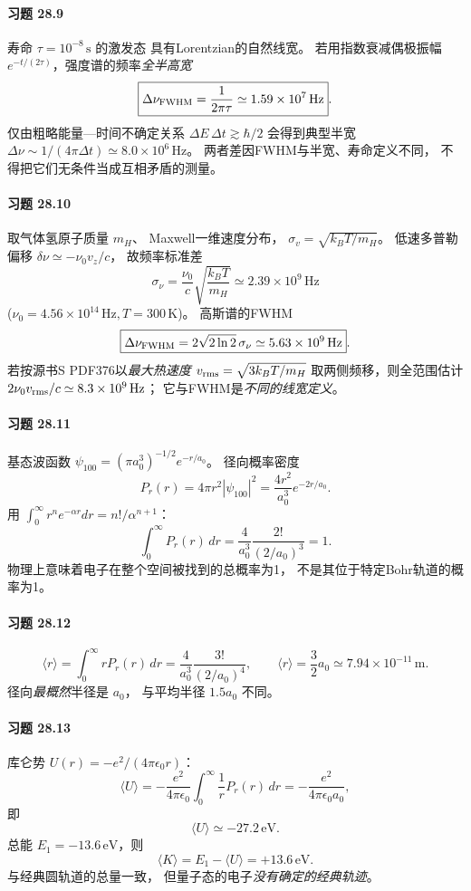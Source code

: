 \paragraph{习题 28.9}
寿命 \(\tau=10^{-8}\,\mathrm s\) 的激发态
具有Lorentzian的自然线宽。
若用指数衰减偶极振幅
\(e^{-t/(2\tau)}\)，强度谱的频率\emph{全半高宽}
\[
\boxed{\Delta\nu_{\rm FWHM}=\frac1{2\pi\tau}
\simeq1.59\times10^7\,\mathrm{Hz}}.
\]
仅由粗略能量—时间不确定关系
\(\Delta E\,\Delta t\gtrsim\hbar/2\)
会得到典型半宽
\(\Delta\nu\sim1/(4\pi\Delta t)\simeq8.0\times10^6\,\mathrm{Hz}\)。
两者差因FWHM与半宽、寿命定义不同，
不得把它们无条件当成互相矛盾的测量。

\paragraph{习题 28.10}
取气体氢原子质量 \(m_H\)、
Maxwell一维速度分布，
\(\sigma_v=\sqrt{k_BT/m_H}\)。
低速多普勒偏移
\(\delta\nu\simeq-\nu_0v_z/c\)，
故频率标准差
\[
\boxed{\sigma_\nu
=\frac{\nu_0}{c}\sqrt{\frac{k_BT}{m_H}}
\simeq2.39\times10^9\,\mathrm{Hz}}
\]
(\(\nu_0=4.56\times10^{14}\,\mathrm{Hz},T=300\,\mathrm K\))。
高斯谱的FWHM
\[
\boxed{\Delta\nu_{\rm FWHM}
=2\sqrt{2\ln2}\,\sigma_\nu
\simeq5.63\times10^9\,\mathrm{Hz}}.
\]
若按源书S PDF376以\emph{最大热速度}
\(v_{\rm rms}=\sqrt{3k_BT/m_H}\)
取两侧频移，则全范围估计
\(2\nu_0v_{\rm rms}/c\simeq8.3\times10^9\,\mathrm{Hz}\)；
它与FWHM是\emph{不同的线宽定义}。

\paragraph{习题 28.11}
基态波函数
\(\psi_{100}=(\pi a_0^3)^{-1/2}e^{-r/a_0}\)。
径向概率密度
\[
P_r(r)=4\pi r^2|\psi_{100}|^2
=\frac{4r^2}{a_0^3}e^{-2r/a_0}.
\]
用 \(\int_0^\infty r^ne^{-\alpha r}dr=n!/\alpha^{n+1}\)：
\[
\boxed{\int_0^\infty P_r(r)\,dr
=\frac4{a_0^3}\frac{2!}{(2/a_0)^3}=1}.
\]
物理上意味着电子在整个空间被找到的总概率为1，
不是其位于特定Bohr轨道的概率为1。

\paragraph{习题 28.12}
\[
\langle r\rangle=\int_0^\infty rP_r(r)\,dr
=\frac4{a_0^3}\frac{3!}{(2/a_0)^4},
\qquad
\boxed{\langle r\rangle=\frac32a_0
\simeq7.94\times10^{-11}\,\mathrm m}.
\]
径向\emph{最概然}半径是 \(a_0\)，
与平均半径 \(1.5a_0\) 不同。

\paragraph{习题 28.13}
库仑势 \(U(r)=-e^2/(4\pi\epsilon_0r)\)：
\[
\langle U\rangle=-\frac{e^2}{4\pi\epsilon_0}
\int_0^\infty \frac1rP_r(r)\,dr
=-\frac{e^2}{4\pi\epsilon_0a_0},
\]
即
\[
\boxed{\langle U\rangle\simeq-27.2\,\mathrm{eV}}.
\]
总能 \(E_1=-13.6\,\mathrm{eV}\)，则
\[
\boxed{\langle K\rangle=E_1-\langle U\rangle
=+13.6\,\mathrm{eV}}.
\]
与经典圆轨道的总量一致，
但量子态的电子\emph{没有确定的经典轨迹}。


